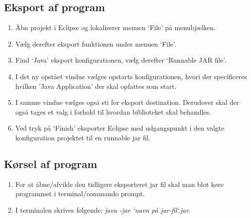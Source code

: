 \subsection{Eksport af program}
\begin{enumerate}   
    \item Åbn projekt i Eclipse og lokaliserer menuen ‘File’ på menubjælken.
    \item Vælg derefter eksport funktionen under menuen ‘File’.
    \item Find ‘Java’ eksport konfigurationen, vælg derefter ‘Runnable JAR file’.
    \item I det ny opstået vindue vælges opstarts konfigurationen, hvori der specificeres hvilken ’Java Application’ der skal opfattes som start.
    \item I samme vindue vælges også sti for eksport destination. Derudover skal der også tages et valg i forhold til hvordan biblioteket skal behandles. 
    \item Ved tryk på ‘Finish’ eksporter Eclipse med udgangspunkt i den valgte konfiguration projektet til en runnable jar fil.\\
\end{enumerate}

\subsection{Kørsel af program}
\begin{enumerate}   
    \item For at åbne/afvikle den tidligere eksporteret jar fil skal man blot køre programmet i terminal/commando prompt.
    \item I terminalen skrives følgende: \textit{java -jar ‘navn på jar-fil‘.jar}.\\
\end{enumerate}